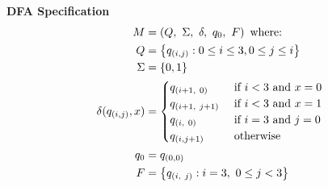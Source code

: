 \begin{Answer}
  \step
  \textbf{DFA Specification}
  \begin{align*}
    M &= \left( Q,\ \Sigma,\ \delta,\ q_0,\ F \right) \text{ where: }\\
    Q &= \left\{ q_{(i, j)} : 0 \leq i \le 3, 0 \leq j \leq i\right\} \\
    \Sigma &= \left\{0, 1\right\} \\
    \delta(q_{(i, j)}, x) &= \begin{cases}
      q_{(i+1,\ 0)} &\text{ if } i < 3 \text{ and } x = 0 \\
      q_{(i+1,\ j+1)} &\text{ if } i < 3 \text{ and } x = 1 \\
      q_{(i,\ 0)} &\text{ if } i = 3 \text{ and } j = 0 \\
      q_{(i, j+1)} &\text{ otherwise }
    \end{cases} \\
    q_0 &= q_{(0, 0)} \\
    F &= \left\{ q_{(i,\ j)} : i = 3,\ 0 \leq j < 3 \right\}
  \end{align*}
\end{Answer}
